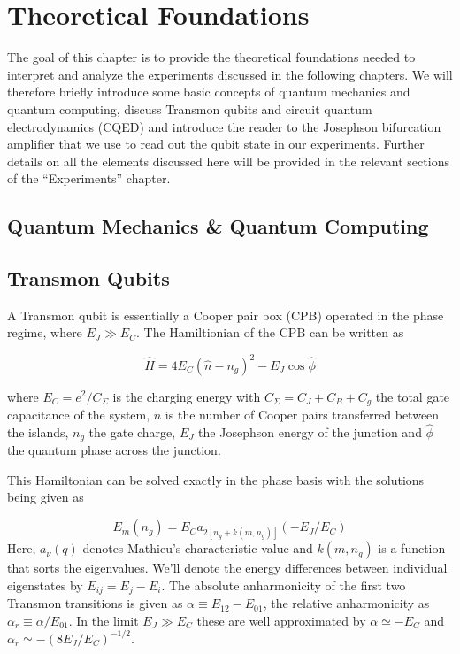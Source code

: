 \chapter{Theoretical Foundations}

The goal of this chapter is to provide the theoretical foundations needed to interpret and analyze the experiments discussed in the following chapters. We will therefore briefly introduce some basic concepts of quantum mechanics and quantum computing, discuss Transmon qubits and circuit quantum electrodynamics (CQED) and introduce the reader to the Josephson bifurcation amplifier that we use to read out the qubit state in our experiments. Further details on all the elements discussed here will be provided in the relevant sections of the ``Experiments'' chapter.

\section{Quantum Mechanics \& Quantum Computing}

\section{Transmon Qubits}

A Transmon qubit is essentially a Cooper pair box (CPB) operated in the phase regime, where $E_J \gg E_C$. The Hamiltionian of the CPB can be written as \citep{cottet_implementation_2002}

\begin{equation}
\hat{H} = 4 E_C \left( \hat{n} - n_g\right)^2-E_J \cos{\hat{\phi}}
\end{equation}

where $E_C = e^2 / C_\Sigma$ is the charging energy with $C_\Sigma = C_J+C_B+C_g$ the total gate capacitance of the system, $\hat{n}$ is the number of Cooper pairs transferred between the islands, $n_g$ the gate charge, $E_J$ the Josephson energy of the junction and $\hat{\phi}$ the quantum phase across the junction.

This Hamiltonian can be solved exactly in the phase basis with the solutions being given as\citep{koch_charge-insensitive_2007,cottet_implementation_2002}

\begin{equation}
E_m(n_g) = E_C a_{2[n_g+k(m,n_g)]}(-E_J/E_C)
\end{equation}
Here, $a_\nu(q)$ denotes  Mathieu's characteristic value and $k(m,n_g)$ is a function that sorts the eigenvalues. We'll denote the energy differences between individual eigenstates by $E_{ij} = E_j - E_i$. The absolute anharmonicity of the first two Transmon transitions is given as $\alpha \equiv E_{12}-E_{01}$, the relative anharmonicity as $\alpha_r \equiv \alpha / E_{01}$. In the limit $E_J \gg E_C$ these are well approximated by $\alpha \simeq -E_C$ and $\alpha_r \simeq -(8E_J / E_C)^{-1/2}$.

